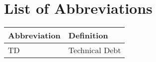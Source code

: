 \chapter{List of Abbreviations}

\begin{table}[htbp!]
\centering
\begin{tabular}{ll}
Abbreviation & Definition                                                            \\ \midrule
TD & Technical Debt \\
\end{tabular}
\end{table}
